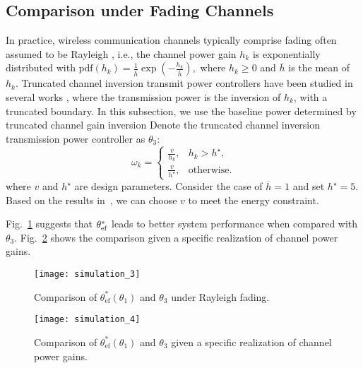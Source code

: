\documentclass[twocolumn]{autart}    \usepackage{cite}
\begin{document}
{\subsection{Comparison under Fading Channels }\label{subsec:Comparison under Time-varying channel power gains}
In practice, wireless communication channels
typically comprise fading often assumed to be Rayleigh \cite{rappaport1996wireless}, i.e., the channel power gain $h_k$ is exponentially distributed with $\mathrm{pdf}(h_k)=\frac{1}{\overline h}\exp{(-\frac{h_k}{\overline h})},$
where $h_k\geqslant0$ and $\overline h$ is the mean of $h_k$.
{Truncated channel inversion transmit
power controllers have been studied in several works
\cite{quevedo2012kalman,leong2012power,goldsmith1997capacity}, where the transmission power is the inversion of $h_k$,
with a truncated boundary. In this subsection, we use the baseline power
determined by truncated channel gain inversion }
Denote the truncated channel inversion transmission power controller as $\theta_3$:
\begin{equation}\label{eqn:truncated-channel-inversoin-trans-power-controller}
 \omega_k= \left\{\begin{array}{ll}
                                  \frac{v}{h_k}          , &  h_k>h^\star,\\
                                       \frac{v}{h^\star}      ,  & \mathrm{otherwise}.
\end{array}\right.
\end{equation}
where $v$ and $h^\star$ are design parameters.
Consider the case of $\overline h=1$ and set $h^\star=5$. Based on the results in~\cite{leong2012power}, we can choose $v$ to meet the energy constraint.
{Fig.~\ref{fig:simulation_3} suggests that $\theta_{\rm ef}^*$ leads
to better system performance when compared with $\theta_3$. Fig.~\ref{fig:simulation_4}
shows the comparison given a specific realization of channel power gains.
\begin{figure}[thp]
  \centering
  \texttt{[image: simulation\_3]}
  \caption{Comparison of $\theta^*_{\text{ef}}(\theta_1)$ and $\theta_3$ under Rayleigh fading.} \label{fig:simulation_3}
  \vspace{-1mm}
\end{figure}
\begin{figure}[thp]
  \centering
  \texttt{[image: simulation\_4]}
  \caption{Comparison of $\theta^*_{\text{ef}}(\theta_1)$ and $\theta_3$ given a specific realization of channel power gains.} \label{fig:simulation_4}
  \vspace{-1mm}
\end{figure}

}}
\end{document}
